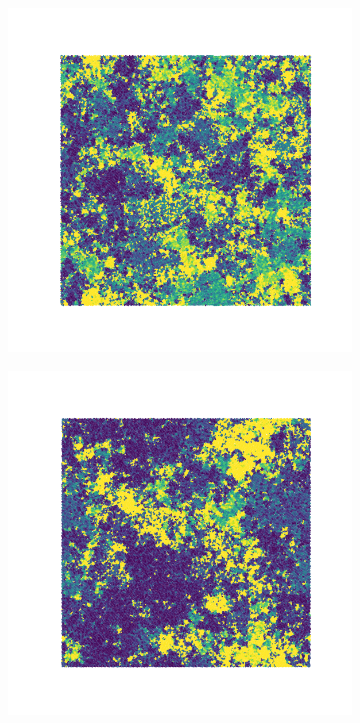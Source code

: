 \documentclass[a4paper]{article}
\begin{document}
\begin{figure}[ht]
	\centering
	\begin{subfigure}[ht]{.33\textwidth}
		\includegraphics[width=1\columnwidth]{698_-1.png}
	\end{subfigure}\hfil
	\begin{subfigure}[ht]{.33\textwidth}
		\includegraphics[width=1\columnwidth]{704_-1.png}

\end{subfigure}
\end{figure}
\end{document}
